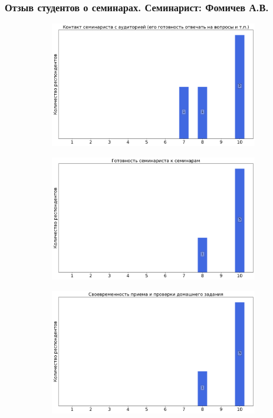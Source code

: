     \subsubsection{Отзыв студентов о семинарах. Семинарист: Фомичев А.В.}
		\begin{figure}[H]
			\centering
			\begin{subfigure}[b]{0.45\textwidth}
				\centering
				\includegraphics[width=\textwidth]{images/2 course/Аналитическая механика/seminarists-marks-Фомичев А.В.-0.png}
			\end{subfigure}
			\begin{subfigure}[b]{0.45\textwidth}
				\centering
				\includegraphics[width=\textwidth]{images/2 course/Аналитическая механика/seminarists-marks-Фомичев А.В.-1.png}
			\end{subfigure}
			\begin{subfigure}[b]{0.45\textwidth}
				\centering
				\includegraphics[width=\textwidth]{images/2 course/Аналитическая механика/seminarists-marks-Фомичев А.В.-2.png}

\end{subfigure}
\end{figure}
